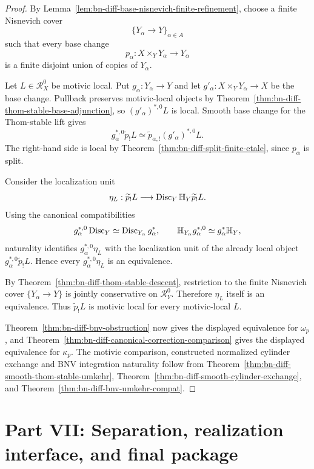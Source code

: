 \begin{proof}
By Lemma~\ref{lem:bn-diff-base-nisnevich-finite-refinement}, choose a finite
Nisnevich cover
\[
    \{Y_\alpha\to Y\}_{\alpha\in A}
\]
such that every base change
\[
    p_\alpha:
    X\times_YY_\alpha\longrightarrow Y_\alpha
\]
is a finite disjoint union of copies of \(Y_\alpha\).

Let \(L\in\mathcal R_X^0\) be motivic local.  Put
\(g_\alpha:Y_\alpha\to Y\) and let
\(g'_\alpha:X\times_YY_\alpha\to X\) be the base change.  Pullback preserves
motivic-local objects by
Theorem~\ref{thm:bn-diff-thom-stable-base-adjunction}, so
\((g'_\alpha)^{*,0}L\) is local.  Smooth base change for the Thom-stable lift
gives
\[
  g_\alpha^{*,0}\widetilde p_!L
  \simeq
  \widetilde p_{\alpha,!}(g'_\alpha)^{*,0}L.
\]
The right-hand side is local by
Theorem~\ref{thm:bn-diff-split-finite-etale}, since \(p_\alpha\) is split.

Consider the localization unit
\[
  \eta_L:
  \widetilde p_!L
  \longrightarrow
  \operatorname{Disc}_Y\mathbb H_Y\widetilde p_!L.
\]
Using the canonical compatibilities
\[
  g_\alpha^{*,0}\operatorname{Disc}_Y
  \simeq
  \operatorname{Disc}_{Y_\alpha}g_\alpha^*,
  \qquad
  \mathbb H_{Y_\alpha}g_\alpha^{*,0}
  \simeq
  g_\alpha^*\mathbb H_Y,
\]
naturality identifies \(g_\alpha^{*,0}\eta_L\) with the localization unit of
the already local object
\(g_\alpha^{*,0}\widetilde p_!L\).  Hence every
\(g_\alpha^{*,0}\eta_L\) is an equivalence.

By Theorem~\ref{thm:bn-diff-thom-stable-descent}, restriction to the finite
Nisnevich cover \(\{Y_\alpha\to Y\}\) is jointly conservative on
\(\mathcal R_Y^0\).  Therefore \(\eta_L\) itself is an equivalence.  Thus
\(\widetilde p_!L\) is motivic local for every motivic-local \(L\).

Theorem~\ref{thm:bn-diff-bnv-obstruction} now gives the displayed equivalence
for \(\omega_p\), and
Theorem~\ref{thm:bn-diff-canonical-correction-comparison} gives the displayed
equivalence for \(\kappa_p\).  The motivic comparison, constructed normalized
cylinder exchange and BNV integration naturality follow from
Theorem~\ref{thm:bn-diff-smooth-thom-stable-umkehr},
Theorem~\ref{thm:bn-diff-smooth-cylinder-exchange}, and
Theorem~\ref{thm:bn-diff-bnv-umkehr-compat}.
\end{proof}

\section*{Part VII: Separation, realization interface, and final package}

